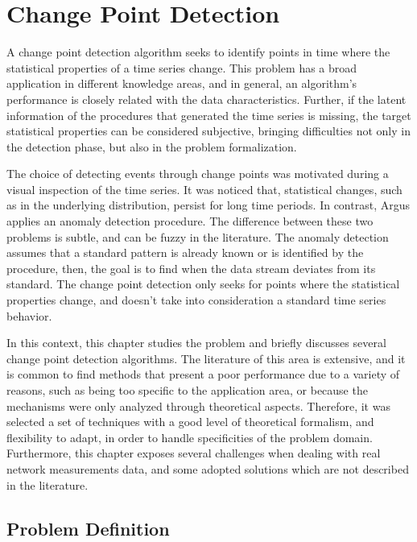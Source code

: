 \chapter{Change Point Detection}
\label{chap:change_point_detection}

A change point detection algorithm seeks to identify points in time where the
statistical properties of a time series change. This problem has a broad
application in different knowledge areas, and in general, an algorithm's
performance is closely related with the data characteristics.
Further, if the latent information of the procedures that generated the time
series is missing, the target statistical properties can be considered
subjective, bringing difficulties not only in the detection phase, but also in
the problem formalization.

The choice of detecting events through change points was motivated during a
visual inspection of the time series.
It was noticed that, statistical changes, such as in the underlying
distribution, persist for long time periods.
In contrast, Argus applies an anomaly detection procedure.
The difference between
these two problems is subtle, and can be fuzzy in the literature. The
anomaly detection assumes that a standard pattern is already known or
is identified by the procedure, then, the goal is to find when the data
stream
deviates from its standard. The change point detection only seeks for
points where the statistical properties change, and doesn't take into
consideration a standard time series behavior.

In this context, this chapter studies the problem and briefly discusses
several change point detection algorithms. The literature of this area is
extensive, and it is common to find methods that present a poor performance
due to a variety of reasons, such as being too specific to the application
area, or because the mechanisms were only analyzed through theoretical
aspects. Therefore, it was selected a set of techniques with a good level
of theoretical formalism, and flexibility to adapt, in order to handle
specificities of the problem domain. Furthermore, this chapter exposes several
challenges when dealing with real network measurements data,
and some adopted solutions which are not described in the literature.

\section{Problem Definition}

